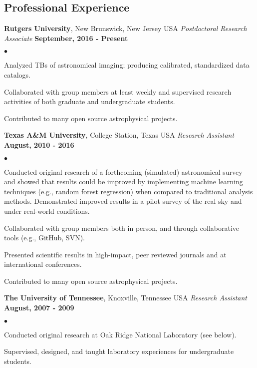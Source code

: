 \documentclass[margin,line, 11pt]{res}
\newenvironment{list2}{
  \begin{list}{$\bullet$}{%
      \setlength{\itemsep}{0in}
      \setlength{\parsep}{0in} \setlength{\parskip}{0in}
      \setlength{\topsep}{0in} \setlength{\partopsep}{0in} 
      \setlength{\leftmargin}{0.2in}}}{\end{list}}
\begin{document}
\begin{resume}
\section{Professional Experience}
\textbf{Rutgers University}, New Brunswick, New Jersey USA \newline
\textit{Postdoctoral Research Associate} \hfill \textbf{September, 2016 - Present}\newline
    \begin{list2}
    	\vspace*{-5mm}
    	\item Analyzed TBs of astronomical imaging; producing calibrated, standardized data catalogs.
    	\item Collaborated with group members at least weekly and supervised research activities of both graduate and undergraduate students.
    	\item Contributed to many open source astrophysical projects.
    \end{list2}
\vspace*{-4mm}

\textbf{Texas A\&M University}, College Station, Texas USA\newline
\textit{Research Assistant} \hfill \textbf{August, 2010 - 2016}\newline
    \begin{list2}
    	\vspace*{-5mm}
    	\item Conducted original research of a forthcoming (simulated) astronomical survey and showed that results could be improved by implementing machine learning techniques (e.g., random forest regression) when compared to traditional analysis methods. Demonstrated improved results in a pilot survey of the real sky and under real-world conditions.    
    	\item Collaborated with group members both in person, and through collaborative tools (e.g., GitHub, SVN).
    	\item Presented scientific results in high-impact, peer reviewed journals and at international conferences.
    	\item Contributed to many open source astrophysical projects.
    \end{list2}
\vspace*{-4mm}

\textbf{The University of Tennessee}, Knoxville, Tennessee USA\newline
\textit{Research Assistant} \hfill \textbf{August, 2007 - 2009}\newline
    \begin{list2}
    	\vspace*{-5mm}
    	\item Conducted original research at Oak Ridge National Laboratory (see below).
    	\item Supervised, designed, and taught laboratory experiences for undergraduate students.
    \end{list2}
\vspace*{-4mm}


\end{resume}
\end{document}
